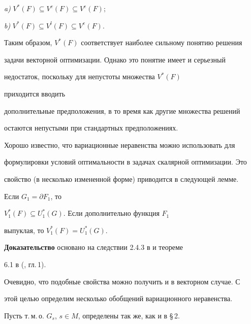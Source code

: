 \begin{lems}


{\em a)} $V^*(F)\subseteq V^c(F)\subseteq V^e(F);$


{\em b)} $V^*(F)\subseteq V^l(F)\subseteq V^e(F)$.


\end{lems}





Таким образом, $V^*(F)$ соответствует наиболее сильному понятию решения


задачи векторной оптимизации. Однако это понятие имеет и серьезный


недостаток, поскольку для непустоты множества $V^*(F)$


приходится вводить


дополнительные предположения, в то время как другие множества решений


остаются непустыми при стандартных предположениях.





Хорошо известно, что вариационные неравенства можно использовать для


формулировки условий оптимальности в задачах скалярной оптимизации. Это


свойство (в несколько измененной форме) приводится в следующей лемме.





\begin{lems}


Если $G_1=\partial F_1$, то


$V^*_1(F)\subseteq U^*_1(G)$. Если дополнительно функция $F_1$


выпуклая, то $V^*_1(F)=U^*_1(G)$.


\end{lems}





{\bf Доказательство} основано на следствии 2.4.3 в \cite{Cl} и теореме


6.1 в (\cite{Dem}, гл.\,1).





Очевидно, что подобные свойства можно получить и в векторном случае. С


этой целью определим несколько обобщений вариационного неравенства.


Пусть т.\,м.\,о. $G_s$, $s\in M$, определены так же, как и в \S\,2.



